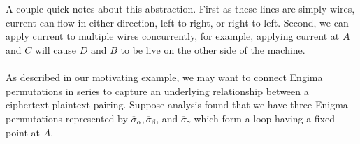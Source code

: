 
    \begin{center}
    \end{center}
    A couple quick notes about this abstraction. First as these lines are simply wires, current can flow in either direction, left-to-right, or right-to-left. 
    Second, we can apply current to multiple wires concurrently, for example, applying current at $A$ and $C$ will cause $D$ and $B$ to be live on the other side of the machine.
    \\\\As described in our motivating example, we may want to connect Engima permutations in series to capture an underlying relationship between a ciphertext-plaintext pairing. 
    Suppose analysis found that we have three Enigma permutations represented by $\overline\sigma_\alpha, \overline\sigma_\beta$, and $\overline\sigma_\gamma$ which form a loop having a fixed point at $A$. 
